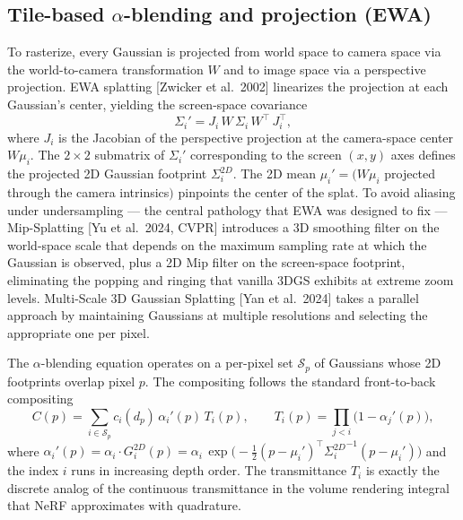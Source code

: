 \subsection{\texorpdfstring{Tile-based \(\alpha\)-blending and projection (EWA)}{Tile-based \textbackslash alpha-blending and projection (EWA)}}\label{tile-based-alpha-blending-and-projection-ewa}

To rasterize, every Gaussian is projected from world space to camera space via the world-to-camera transformation \(W\) and to image space via a perspective projection. EWA splatting {[}Zwicker et al.~2002{]} linearizes the projection at each Gaussian's center, yielding the screen-space covariance
\[\Sigma_i' = J_i\,W\,\Sigma_i\,W^{\top}\,J_i^{\top},\]
where \(J_i\) is the Jacobian of the perspective projection at the camera-space center \(W\mu_i\). The \(2\times2\) submatrix of \(\Sigma_i'\) corresponding to the screen \((x,y)\) axes defines the projected 2D Gaussian footprint \(\Sigma_i^{2D}\). The 2D mean \(\mu_i'=(W\mu_i\) projected through the camera intrinsics\()\) pinpoints the center of the splat. To avoid aliasing under undersampling --- the central pathology that EWA was designed to fix --- Mip-Splatting {[}Yu et al.~2024, CVPR{]} introduces a 3D smoothing filter on the world-space scale that depends on the maximum sampling rate at which the Gaussian is observed, plus a 2D Mip filter on the screen-space footprint, eliminating the popping and ringing that vanilla 3DGS exhibits at extreme zoom levels. Multi-Scale 3D Gaussian Splatting {[}Yan et al.~2024{]} takes a parallel approach by maintaining Gaussians at multiple resolutions and selecting the appropriate one per pixel.

The \(\alpha\)-blending equation operates on a per-pixel set \(\mathcal{S}_p\) of Gaussians whose 2D footprints overlap pixel \(p\). The compositing follows the standard front-to-back compositing
\[C(p) = \sum_{i\in\mathcal{S}_p} c_i(d_p)\,\alpha_i'(p)\,T_i(p),\qquad T_i(p) = \prod_{j<i} \big(1 - \alpha_j'(p)\big),\]
where \(\alpha_i'(p) = \alpha_i\cdot G_i^{2D}(p) = \alpha_i\,\exp\!\big(-\tfrac12(p-\mu_i')^{\top}{\Sigma_i^{2D}}^{-1}(p-\mu_i')\big)\) and the index \(i\) runs in increasing depth order. The transmittance \(T_i\) is exactly the discrete analog of the continuous transmittance in the volume rendering integral that NeRF approximates with quadrature.

